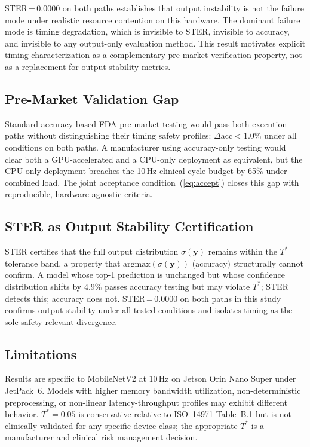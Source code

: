 \documentclass[journal,10pt,twocolumn]{IEEEtran}
\begin{document}
STER\,=\,0.0000 on both paths establishes that output instability is
not the failure mode under realistic resource contention on this
hardware.
The dominant failure mode is timing degradation, which is invisible
to STER, invisible to accuracy, and invisible to any output-only
evaluation method.
This result motivates explicit timing characterization as a
complementary pre-market verification property, not as a replacement
for output stability metrics.

\subsection{Pre-Market Validation Gap}

Standard accuracy-based FDA pre-market testing would pass both
execution paths without distinguishing their timing safety profiles:
$\Delta\mathrm{acc}{<}1.0\%$ under all conditions on both paths.
A manufacturer using accuracy-only testing would clear both a
GPU-accelerated and a CPU-only deployment as equivalent, but the CPU-only deployment breaches the 10\,Hz clinical cycle budget by 65\%
under combined load.
The joint acceptance condition~(\ref{eq:accept}) closes this gap
with reproducible, hardware-agnostic criteria.

\subsection{STER as Output Stability Certification}

STER certifies that the full output distribution $\sigma(\mathbf{y})$
remains within the $T^*$ tolerance band, a property that
$\mathrm{argmax}(\sigma(\mathbf{y}))$ (accuracy) structurally cannot
confirm.
A model whose top-1 prediction is unchanged but whose confidence
distribution shifts by 4.9\% passes accuracy testing but may
violate $T^*$; STER detects this; accuracy does not.
STER\,=\,0.0000 on both paths in this study confirms output stability
under all tested conditions and isolates timing as the sole
safety-relevant divergence.

\subsection{Limitations}

Results are specific to MobileNetV2 at 10\,Hz on Jetson Orin Nano Super
under JetPack~6.
Models with higher memory bandwidth utilization, non-deterministic
preprocessing, or non-linear latency-throughput profiles may exhibit
different behavior.
$T^*{=}0.05$ is conservative relative to ISO~14971 Table~B.1 but is
not clinically validated for any specific device class; the appropriate
$T^*$ is a manufacturer and clinical risk management decision.
\end{document}
